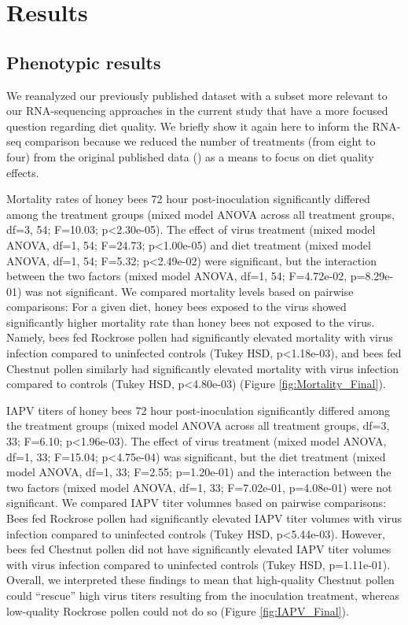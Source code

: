 \documentclass[11pt,a4paper,oldfontcommands,openany]{memoir}
\numberwithin{equation}{section} %
\begin{document}
\section{Results}

\subsection{Phenotypic results}

We reanalyzed our previously published dataset with a subset more relevant to our RNA-sequencing approaches in the current study that have a more focused question regarding diet quality. We briefly show it again here to inform the RNA-seq comparison because we reduced the number of treatments (from eight to four) from the original published data (\citealt{adamInt}) as a means to focus on diet quality effects.

Mortality rates of honey bees 72 hour post-inoculation significantly differed among the treatment groups (mixed model ANOVA across all treatment groups, df=3, 54; F=10.03; p<2.30e-05). The effect of virus treatment (mixed model ANOVA, df=1, 54; F=24.73; p<1.00e-05) and diet treatment (mixed model ANOVA, df=1, 54; F=5.32; p<2.49e-02) were significant, but the interaction between the two factors (mixed model ANOVA, df=1, 54; F=4.72e-02, p=8.29e-01) was not significant. We compared mortality levels based on pairwise comparisons: For a given diet, honey bees exposed to the virus showed significantly higher mortality rate than honey bees not exposed to the virus. Namely, bees fed Rockrose pollen had significantly elevated mortality with virus infection compared to uninfected controls (Tukey HSD, p<1.18e-03), and bees fed Chestnut pollen similarly had significantly elevated mortality with virus infection compared to controls (Tukey HSD, p<4.80e-03) (Figure \ref{fig:Mortality_Final}).

IAPV titers of honey bees 72 hour post-inoculation significantly differed among the treatment groups (mixed model ANOVA across all treatment groups, df=3, 33; F=6.10; p<1.96e-03). The effect of virus treatment (mixed model ANOVA, df=1, 33; F=15.04; p<4.75e-04) was significant, but the diet treatment (mixed model ANOVA, df=1, 33; F=2.55; p=1.20e-01) and the interaction between the two factors (mixed model ANOVA, df=1, 33; F=7.02e-01, p=4.08e-01) were not significant. We compared IAPV titer volumnes  based on pairwise comparisons: Bees fed Rockrose pollen had significantly elevated IAPV titer volumes with virus infection compared to uninfected controls (Tukey HSD, p<5.44e-03). However, bees fed Chestnut pollen did not have significantly elevated IAPV titer volumes with virus infection compared to uninfected controls (Tukey HSD, p=1.11e-01). Overall, we interpreted these findings to mean that high-quality Chestnut pollen could ``rescue'' high virus titers resulting from the inoculation treatment, whereas low-quality Rockrose pollen could not do so (Figure \ref{fig:IAPV_Final}).
\end{document}
